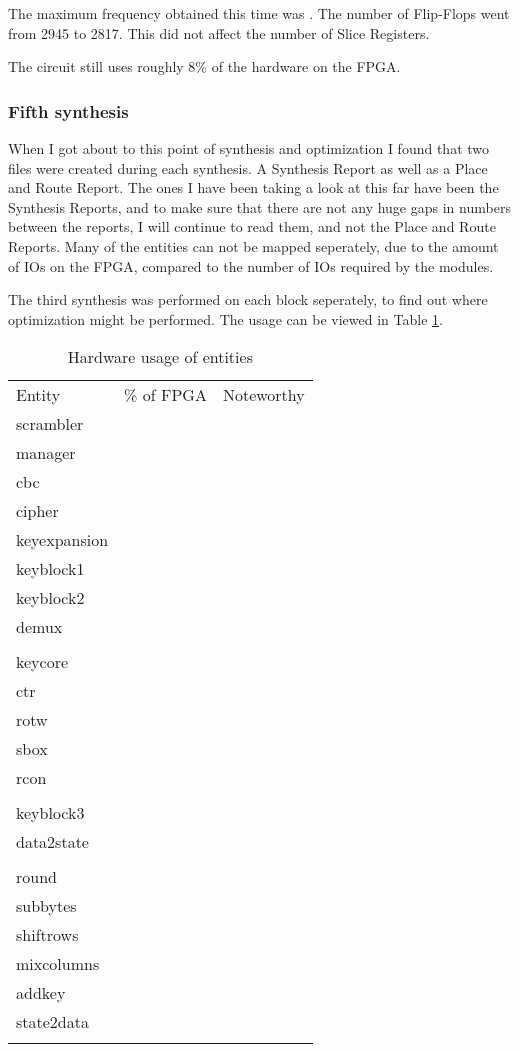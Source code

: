 The maximum frequency obtained this time was . The number of Flip-Flops 
went from 2945 to 2817. This did not affect the number of Slice Registers.

The circuit still uses roughly 8\% of the hardware on the FPGA.

\subsubsection{Fifth synthesis}
When I got about to this point of synthesis and optimization I found that 
two files were created during each synthesis. A Synthesis Report as well 
as a Place and Route Report. The ones I have been taking a look at this far 
have been the Synthesis Reports, and to make sure that there are not any
huge gaps in numbers between the reports, I will continue to read them, 
and not the Place and Route Reports. Many of the entities can not be 
mapped seperately, due to the amount of IOs on the FPGA, compared to the 
number of IOs required by the modules.

The third synthesis was performed on each block seperately, to find out
where optimization might be performed. The usage can be viewed in Table 
\ref{synt:fifth}.

\begin{longtable}{ l | c | c }
  Entity & \% of FPGA & Noteworthy \\
  scrambler & & \\
  manager & & \\
  cbc & & \\
  cipher & & \\
  keyexpansion & & \\
  keyblock1 & & \\
  keyblock2 & & \\
  demux & & \\ \\

  keycore & & \\
  ctr & & \\
  rotw & & \\
  sbox & & \\
  rcon & & \\ \\

  keyblock3 & & \\
  data2state & & \\ \\

  round & & \\
  subbytes & & \\
  shiftrows & & \\
  mixcolumns & & \\
  addkey & & \\

  state2data & & \\

  \caption{Hardware usage of entities}
  \label{synt:fifth}
\end{longtable}

